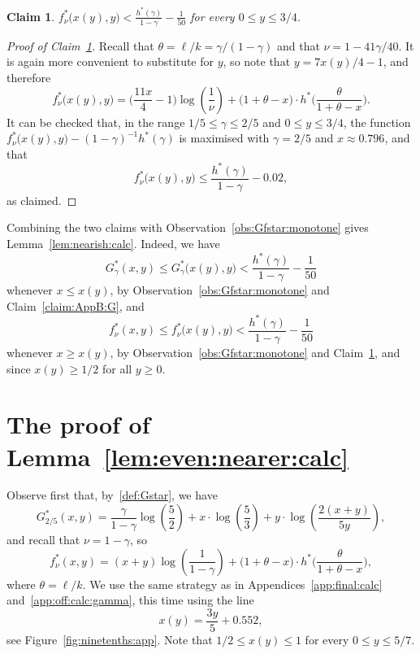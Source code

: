 \documentclass[12pt,reqno]{amsart}
\newtheorem{claim}[theorem]{Claim}
\theoremstyle{definition}
\theoremstyle{remark}
\newenvironment{clmproof}[1]{\begin{proof}[Proof of Claim~\ref{#1}]\let\qednow\qedsymbol\renewcommand{\qedsymbol}{}}{\; \qednow \end{proof}}
\renewcommand{\le}{\leqslant}
\renewcommand{\ge}{\geqslant}
\begin{document}
\begin{claim}\label{claim:AppB:fstar}
$f_\nu^*\big(x(y),y\big) < \displaystyle\frac{h^*(\gamma)}{1-\gamma} - \frac{1}{50}$ for every $0 \le y \le 3/4$.
\end{claim}
 
\begin{clmproof}{claim:AppB:fstar}
Recall that $\theta = \ell/k = \gamma/(1-\gamma)$ and that $\nu = 1 - 41\gamma/40$. It is again more convenient to substitute for $y$, so note that $y = 7x(y)/4 - 1$, and therefore 
$$f_\nu^*\big(x(y),y\big) = \bigg( \frac{11x}{4} - 1 \bigg) \log \left(\frac{1}{\nu}\right) + \big( 1 + \theta - x \big) \cdot h^*\bigg( \frac{\theta}{1 + \theta - x} \bigg).$$
It can be checked that, in the range $1/5 \le \gamma \le 2/5$ and $0 \le y \le 3/4$, the function $f_\nu^*\big(x(y),y\big) - (1-\gamma)^{-1} h^*(\gamma)$ is maximised with $\gamma = 2/5$ and $x \approx 0.796$, and that
$$f_\nu^*\big(x(y),y\big) \le \frac{h^*(\gamma)}{1-\gamma} - 0.02,$$
as claimed.
\end{clmproof}

Combining the two claims with Observation~\ref{obs:Gfstar:monotone} gives Lemma~\ref{lem:nearish:calc}. Indeed, we have 
$$G_\gamma^*(x,y) \le G_\gamma^*\big( x(y),y \big) < \frac{h^*(\gamma)}{1-\gamma} - \frac{1}{50}$$ 
whenever $x \le x(y)$, by Observation~\ref{obs:Gfstar:monotone} and Claim~\ref{claim:AppB:G}, and 
$$f_\nu^*(x,y) \le f^*_\nu\big( x(y),y \big) < \frac{h^*(\gamma)}{1-\gamma} - \frac{1}{50}$$ 
whenever $x \ge x(y)$, by Observation~\ref{obs:Gfstar:monotone} and Claim~\ref{claim:AppB:fstar}, and since $x(y) \ge 1/2$ for all $y \ge 0$. 





\section{The proof of Lemma~\ref{lem:even:nearer:calc}}\label{app:off:calc:twofifths}

Observe first that, by~\eqref{def:Gstar}, %
we have
$$G_{2/5}^*(x,y) = \frac{\gamma}{1-\gamma} \log \left( \frac{5}{2} \right) + x \cdot \log \left(\frac{5}{3} \right) + y \cdot \log \left(\frac{2(x+y)}{5y}\right),$$
and recall that $\nu = 1 - \gamma$, so
$$f_\nu^*(x,y) = (x + y) \log \left(\frac{1}{1 - \gamma}\right) + \big( 1 + \theta - x \big) \cdot h^*\bigg( \frac{\theta}{1 + \theta - x} \bigg),$$
where $\theta = \ell/k$. %
We use the same strategy as in Appendices~\ref{app:final:calc} and~\ref{app:off:calc:gamma}, this time using the line 
\begin{equation}\label{def:xstar:of:y}
x(y) = \frac{3y}{5} + 0.552,
\end{equation}
see Figure~\ref{fig:ninetenths:app}. Note that $1/2 \le x(y) \le 1$ for every $0 \le y \le 5/7$. 
\end{document}
